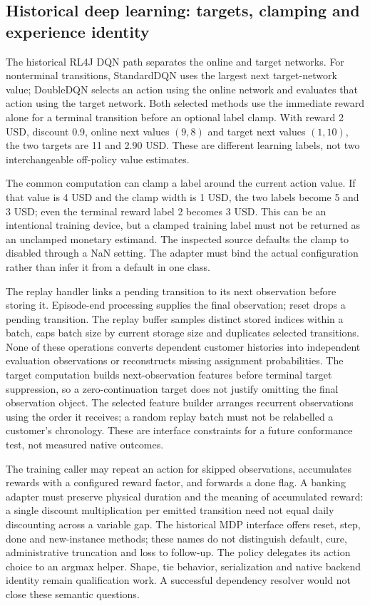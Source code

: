 \subsection{Historical deep learning: targets, clamping and experience identity}
The historical RL4J DQN path separates the online and target networks. For nonterminal transitions, StandardDQN uses the largest next target-network value; DoubleDQN selects an action using the online network and evaluates that action using the target network. Both selected methods use the immediate reward alone for a terminal transition before an optional label clamp. With reward 2 USD, discount 0.9, online next values $(9,8)$ and target next values $(1,10)$, the two targets are 11 and 2.90 USD. These are different learning labels, not two interchangeable off-policy value estimates.~\citep{exec24_policyjava_rl4j,exec24_policyjava_comparison}

The common computation can clamp a label around the current action value. If that value is 4 USD and the clamp width is 1 USD, the two labels become 5 and 3 USD; even the terminal reward label 2 becomes 3 USD. This can be an intentional training device, but a clamped training label must not be returned as an unclamped monetary estimand. The inspected source defaults the clamp to disabled through a NaN setting. The adapter must bind the actual configuration rather than infer it from a default in one class.~\citep{exec24_policyjava_rl4j,exec24_policyjava_comparison}

The replay handler links a pending transition to its next observation before storing it. Episode-end processing supplies the final observation; reset drops a pending transition. The replay buffer samples distinct stored indices within a batch, caps batch size by current storage size and duplicates selected transitions. None of these operations converts dependent customer histories into independent evaluation observations or reconstructs missing assignment probabilities. The target computation builds next-observation features before terminal target suppression, so a zero-continuation target does not justify omitting the final observation object. The selected feature builder arranges recurrent observations using the order it receives; a random replay batch must not be relabelled a customer's chronology. These are interface constraints for a future conformance test, not measured native outcomes.~\citep{exec24_policyjava_rl4j}

The training caller may repeat an action for skipped observations, accumulates rewards with a configured reward factor, and forwards a done flag. A banking adapter must preserve physical duration and the meaning of accumulated reward: a single discount multiplication per emitted transition need not equal daily discounting across a variable gap. The historical MDP interface offers reset, step, done and new-instance methods; these names do not distinguish default, cure, administrative truncation and loss to follow-up. The policy delegates its action choice to an argmax helper. Shape, tie behavior, serialization and native backend identity remain qualification work. A successful dependency resolver would not close these semantic questions.~\citep{exec24_policyjava_rl4j}

